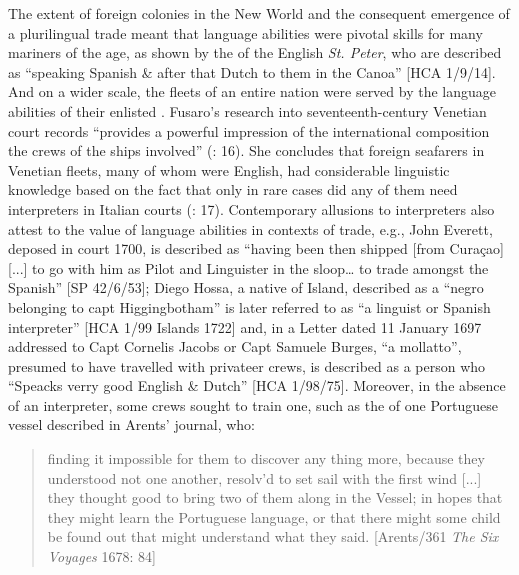 The extent of foreign colonies in the New World and the consequent emergence of a plurilingual  trade meant that language abilities were pivotal skills for many mariners of the age, as shown by the  of the English \textit{St. Peter}, who are described as “speaking Spanish \& after that Dutch to them in the Canoa” [HCA 1/9/14]. And on a wider scale, the  fleets of an entire nation were served by the language abilities of their enlisted . Fusaro’s research into seventeenth-century Venetian court records “provides a powerful impression of the international composition the crews of the ships involved” (\citeyear*{Fusaro2015}: 16). She concludes that foreign seafarers in Venetian fleets, many of whom were English, had considerable linguistic knowledge based on the fact that only in rare cases did any of them need interpreters in Italian courts (\citealt{Fusaro2015}: 17). Contemporary allusions to interpreters also attest to the value of language abilities in contexts of trade, e.g., John Everett, deposed in court 1700, is described as “having been then shipped [from Curaçao] [...] to go with him as Pilot and Linguister in the sloop… to trade amongst the Spanish” [SP 42/6/53]; Diego Hossa, a native of  Island, described as a “negro belonging to capt Higgingbotham” is later referred to as “a linguist or Spanish interpreter” [HCA 1/99  Islands 1722] and, in a Letter dated 11 January {1697} addressed to Capt Cornelis Jacobs or Capt Samuele Burges, “a mollatto”, presumed to have travelled with privateer crews, is described as a person who “Speacks verry good English \& Dutch” [HCA 1/98/75]. Moreover, in the absence of an interpreter, some crews sought to train one, such as the  of one Portuguese vessel described in Arents’ journal, who:

\begin{quotation}
finding it impossible for them to discover any thing more, because they understood not one another, resolv’d to set sail with the first wind [...] they thought good to bring two of them along in the Vessel; in hopes that they might learn the Portuguese language, or that there might some child be found out that might understand what they said. [Arents/361 \textit{The Six Voyages} 1678: 84]\end{quotation}

